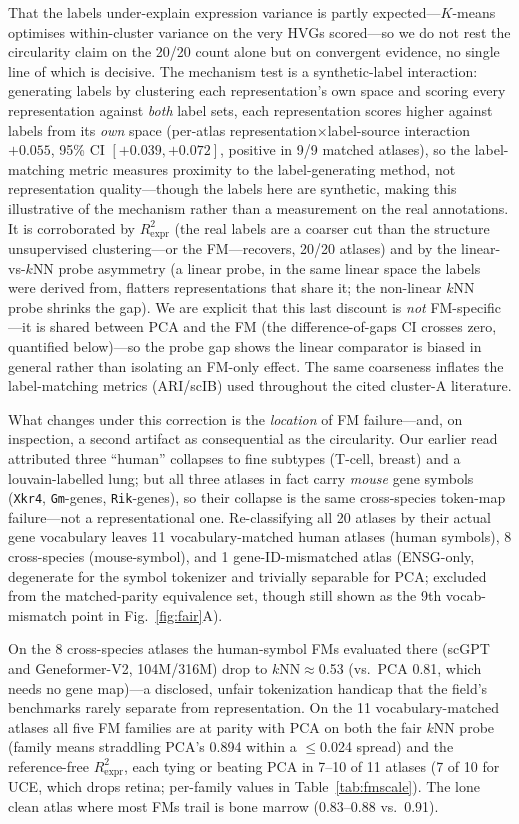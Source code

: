 \documentclass[fleqn,10pt,lineno]{wlpeerj}  %
\begin{document}
That the labels under-explain expression variance is partly expected---$K$-means optimises within-cluster variance on the very HVGs scored---so we do not rest the circularity claim on the 20/20 count alone but on convergent evidence, no single line of which is decisive. The mechanism test is a synthetic-label interaction: generating labels by clustering each representation's own space and scoring every representation against \emph{both} label sets, each representation scores higher against labels from its \emph{own} space (per-atlas representation$\times$label-source interaction $+0.055$, 95\% CI $[+0.039,+0.072]$, positive in 9/9 matched atlases), so the label-matching metric measures proximity to the label-generating method, not representation quality---though the labels here are synthetic, making this illustrative of the mechanism rather than a measurement on the real annotations. It is corroborated by $R^2_{\mathrm{expr}}$ (the real labels are a coarser cut than the structure unsupervised clustering---or the FM---recovers, 20/20 atlases) and by the linear-vs-$k$NN probe asymmetry (a linear probe, in the same linear space the labels were derived from, flatters representations that share it; the non-linear $k$NN probe shrinks the gap). We are explicit that this last discount is \emph{not} FM-specific---it is shared between PCA and the FM (the difference-of-gaps CI crosses zero, quantified below)---so the probe gap shows the linear comparator is biased in general rather than isolating an FM-only effect. The same coarseness inflates the label-matching metrics (ARI/scIB) used throughout the cited cluster-A literature.

What changes under this correction is the \emph{location} of FM failure---and, on inspection, a second artifact as consequential as the circularity. Our earlier read attributed three ``human'' collapses to fine subtypes (T-cell, breast) and a louvain-labelled lung; but all three atlases in fact carry \emph{mouse} gene symbols (\texttt{Xkr4}, \texttt{Gm}-genes, \texttt{Rik}-genes), so their collapse is the same cross-species token-map failure---not a representational one. Re-classifying all 20 atlases by their actual gene vocabulary leaves 11 vocabulary-matched human atlases (human symbols), 8 cross-species (mouse-symbol), and 1 gene-ID-mismatched atlas (ENSG-only, degenerate for the symbol tokenizer and trivially separable for PCA; excluded from the matched-parity equivalence set, though still shown as the 9th vocab-mismatch point in Fig.~\ref{fig:fair}A).

On the 8 cross-species atlases the human-symbol FMs evaluated there (scGPT and Geneformer-V2, 104M/316M) drop to $k$NN${\approx}$0.53 (vs.\ PCA 0.81, which needs no gene map)---a disclosed, unfair tokenization handicap that the field's benchmarks rarely separate from representation. On the 11 vocabulary-matched atlases all five FM families are at parity with PCA on both the fair $k$NN probe (family means straddling PCA's 0.894 within a $\le$0.024 spread) and the reference-free $R^2_{\mathrm{expr}}$, each tying or beating PCA in 7--10 of 11 atlases (7 of 10 for UCE, which drops retina; per-family values in Table~\ref{tab:fmscale}). The lone clean atlas where most FMs trail is bone marrow (0.83--0.88 vs.\ 0.91).
\end{document}
